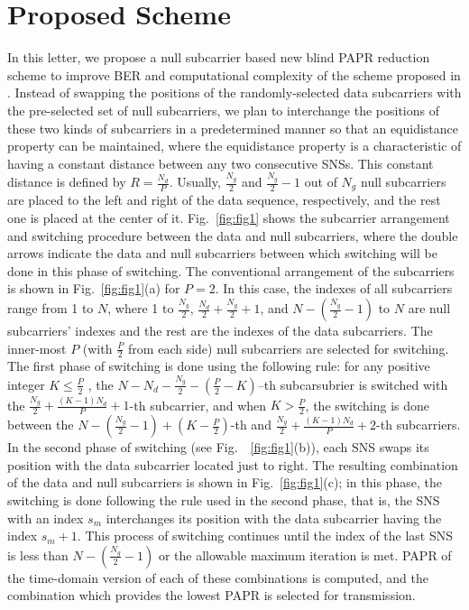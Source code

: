 \documentclass[journal,comsoc]{IEEEtran}
\begin{document}
\section{Proposed Scheme}
In this letter, we propose a null subcarrier based new blind PAPR reduction scheme to improve BER and computational complexity of the scheme proposed in \cite{wong1}. Instead of swapping the positions of the randomly-selected data subcarriers with the pre-selected set of null subcarriers, we plan to interchange the positions of these two kinds of subcarriers in a predetermined manner so that an equidistance property can be maintained, where the equidistance property is a characteristic of having a constant distance between any two consecutive SNSs. This constant distance is defined by $R=\frac{N_d}{P}$. Usually, $\frac{N_g}{2}$  and $\frac{N_g}{2}-1$ out of $N_g$ null subcarriers are placed to the left and right of the data sequence, respectively, and the rest one is placed at the center of it. Fig.~\ref{fig:fig1} shows the subcarrier arrangement and switching procedure between the data and null subcarriers, where the double arrows indicate the data and null subcarriers between which switching will be done in this phase of switching. The conventional arrangement of the subcarriers is shown in Fig.~\ref{fig:fig1}(a) for $P=2$. In this case, the indexes of all subcarriers range from 1 to $N$, where 1 to $\frac{N_g}{2}$, $\frac{N_d}{2}+\frac{N_g}{2}+1$, and $N-(\frac{N_g}{2}-1)$ to $N$ are null subcarriers' indexes and the rest are the indexes of the data subcarriers. The inner-most $P$ (with $\frac{P}{2}$ from each side) null subcarriers are selected for switching. The first phase of switching is done using the following rule: for any positive integer  $K\leq \frac{P}{2}$ , the $N-N_d-\frac{N_g}{2}-(\frac{P}{2}-K)$–th subcarsubrier is switched with the $\frac{N_g}{2}+\frac{(K-1)N_d}{P}+1$-th subcarrier, and when $K>\frac{P}{2}$, the switching is done between the $N-(\frac{N_g}{2}-1)+(K-\frac{P}{2})$-th and $\frac{N_g}{2}+\frac{(K-1)N_d}{P}+2$-th subcarriers. In the second phase of switching (see Fig.~~\ref{fig:fig1}(b)), each SNS swaps its position with the data subcarrier located just to right. The resulting combination of the data and null subcarriers is shown in Fig.~\ref{fig:fig1}(c); in this phase, the switching is done following the rule used in the second phase, that is, the SNS with an index $s_m$ interchanges its position with the data subcarrier having the index $s_m+1$. This process of switching continues until the index of the last SNS is less than $N-(\frac{N_g}{2}-1)$ or the allowable maximum iteration is met. PAPR of the time-domain version of each of these combinations is computed, and the combination which provides the lowest PAPR is selected for transmission.
\end{document}
